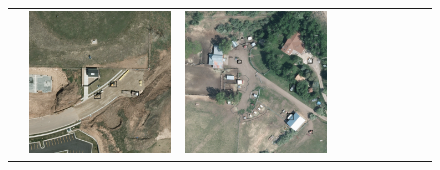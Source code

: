 \begin{figure}[h!]
\begin{tabularx}{\textwidth}{c|*{9}{X}}
    & \includegraphics[trim={440pt 360pt 460pt 555pt},clip,width=\linewidth]{images/015Results/01abb_vs_obb/comp_images/ground_truth_abb/427.png}
    & \includegraphics[trim={740pt 420pt 180pt 510pt},clip,width=\linewidth]{images/015Results/01abb_vs_obb/comp_images/ground_truth_abb/523.png}

\end{tabularx}
\end{figure}
